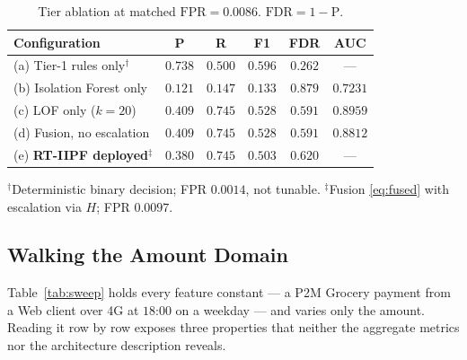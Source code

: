 \documentclass[conference]{IEEEtran}
\begin{document}
\begin{table}[t]
\centering
\caption{Tier ablation at matched $\mathrm{FPR}=0.0086$.
$\mathrm{FDR}=1-\mathrm{P}$.}
\label{tab:ablation}
\renewcommand{\arraystretch}{1.18}
\footnotesize
\setlength{\tabcolsep}{4pt}
\begin{tabular}{@{}lccccc@{}}
\toprule
\textbf{Configuration} & \textbf{P} & \textbf{R} & \textbf{F1} & \textbf{FDR} & \textbf{AUC} \\
\midrule
(a) Tier-1 rules only$^{\dagger}$          & $0.738$ & $0.500$ & $0.596$ & $0.262$ & --- \\
(b) Isolation Forest only                  & $0.121$ & $0.147$ & $0.133$ & $0.879$ & $0.7231$ \\
(c) LOF only ($k=20$)                      & $0.409$ & $0.745$ & $0.528$ & $0.591$ & $0.8959$ \\
(d) Fusion, no escalation                  & $0.409$ & $0.745$ & $0.528$ & $0.591$ & $0.8812$ \\
\midrule
(e) \textbf{RT-IIPF deployed}$^{\ddagger}$ & $0.380$ & $0.745$ & $0.503$ & $0.620$ & --- \\
\bottomrule
\end{tabular}

\vspace{2pt}
{\footnotesize\raggedright
$^{\dagger}$Deterministic binary decision; FPR $0.0014$, not tunable.
$^{\ddagger}$Fusion \eqref{eq:fused} with escalation via $H$;
FPR $0.0097$.\par}
\end{table}

\subsection{Walking the Amount Domain}
\label{subsec:sweep}

Table~\ref{tab:sweep} holds every feature constant --- a P2M Grocery
payment from a Web client over 4G at $18$:$00$ on a weekday --- and
varies only the amount. Reading it row by row exposes three properties
that neither the aggregate metrics nor the architecture description
reveals.
\end{document}
